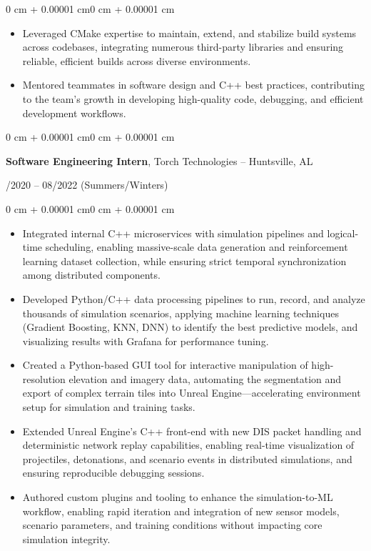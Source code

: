 \documentclass[11pt, letterpaper]{article}
\newenvironment{highlights}{
    \begin{itemize}[
        topsep=0.10 cm,
        parsep=0.10 cm,
        partopsep=0pt,
        itemsep=0pt,
        leftmargin=0.4 cm + 10pt
    ]
}{
    \end{itemize}
}
\newenvironment{onecolentry}{
    \begin{adjustwidth}{0 cm + 0.00001 cm}{0 cm + 0.00001 cm}
}{
    \end{adjustwidth}
}
\newenvironment{twocolentry}[1]{
    \onecolentry
    \def\secondColumn{#1}
    \setcolumnwidth{\fill,4.5cm}
    \begin{paracol}{2}
}{
    \switchcolumn \raggedleft \secondColumn
    \end{paracol}
    \endonecolentry
}
\begin{document}
\begin{onecolentry}
\begin{highlights}
        \item Leveraged CMake expertise to maintain, extend, and stabilize build systems across codebases, integrating numerous third-party libraries and ensuring reliable, efficient builds across diverse environments.
        \item Mentored teammates in software design and C++ best practices, contributing to the team’s growth in developing high-quality code, debugging, and efficient development workflows.
    \end{highlights}
\end{onecolentry}

\vspace{0.4cm}

\begin{twocolentry}{05/2020 – 08/2022 (Summers/Winters)}
    \textbf{Software Engineering Intern}, Torch Technologies -- Huntsville, AL
\end{twocolentry}

\vspace{0.10 cm}
\begin{onecolentry}
    \begin{highlights}
        \item Integrated internal C++ microservices with simulation pipelines and logical-time scheduling, enabling massive-scale data generation and reinforcement learning dataset collection, while ensuring strict temporal synchronization among distributed components.
        \item Developed Python/C++ data processing pipelines to run, record, and analyze thousands of simulation scenarios, applying machine learning techniques (Gradient Boosting, KNN, DNN) to identify the best predictive models, and visualizing results with Grafana for performance tuning.
        \item Created a Python-based GUI tool for interactive manipulation of high-resolution elevation and imagery data, automating the segmentation and export of complex terrain tiles into Unreal Engine—accelerating environment setup for simulation and training tasks.
        \item Extended Unreal Engine’s C++ front-end with new DIS packet handling and deterministic network replay capabilities, enabling real-time visualization of projectiles, detonations, and scenario events in distributed simulations, and ensuring reproducible debugging sessions.
        \item Authored custom plugins and tooling to enhance the simulation-to-ML workflow, enabling rapid iteration and integration of new sensor models, scenario parameters, and training conditions without impacting core simulation integrity.
    \end{highlights}
\end{onecolentry}
\end{document}
